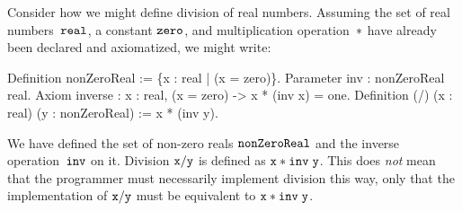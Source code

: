 Consider how we might define division of real numbers. Assuming the
set of real numbers~$\mathtt{real}$, a constant $\mathtt{zero}$, and
multiplication operation~$\mathtt{*}$ have already been declared and
axiomatized, we might write:
%
\begin{source}
Definition nonZeroReal := \{x : real | \iNot (x = zero)\}.
Parameter inv : nonZeroReal \iTo real.
Axiom inverse : \iForall x : real, \iNot (x = zero) -> x * (inv x) = one.
Definition (/) (x : real) (y : nonZeroReal) := x * (inv y).
\end{source}
%
We have defined the set of non-zero reals $\mathtt{nonZeroReal}$ and
the inverse operation~$\mathtt{inv}$ on it. Division $\mathtt{x/y}$ is defined
as $\mathtt{x * inv\; y}$. This does \emph{not} mean that the
programmer must necessarily implement division this way, only that the
implementation of $\mathtt{x/y}$ must be equivalent to $\mathtt{x * inv\;y}$.

